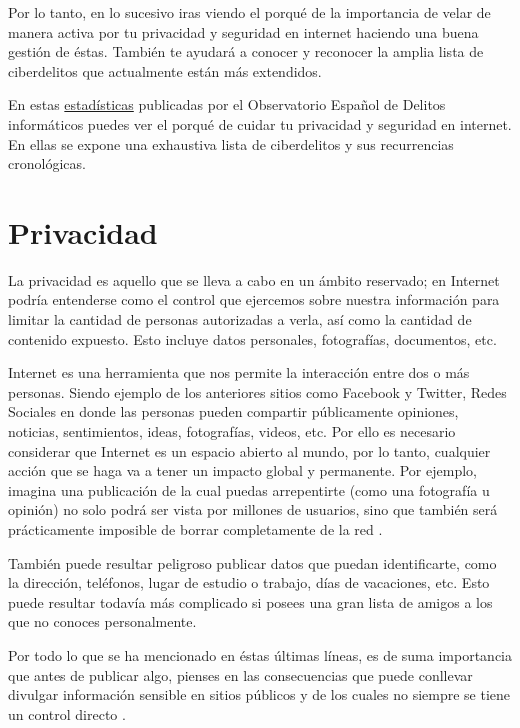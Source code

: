 \documentclass[
  spanish,
  a4paper,
  openany]{book}
\begin{document}
Por lo tanto, en lo sucesivo iras viendo el porqué de la importancia de velar de manera activa por tu privacidad y seguridad en internet haciendo una buena gestión de éstas. También te ayudará a conocer y reconocer la amplia lista de ciberdelitos que actualmente están más extendidos.

En estas \href{https://oedi.es/estadisticas/}{estadísticas} publicadas por el Observatorio Español de Delitos informáticos \citep{oedi} puedes ver el porqué de cuidar tu privacidad y seguridad en internet. En ellas se expone una exhaustiva lista de ciberdelitos y sus recurrencias cronológicas.

\hypertarget{privacidad}{%
\section{Privacidad}\label{privacidad}}

La privacidad es aquello que se lleva a cabo en un ámbito reservado; en Internet podría entenderse como el control que ejercemos sobre nuestra información para limitar la cantidad de personas autorizadas a verla, así como la cantidad de contenido expuesto. Esto incluye datos personales, fotografías, documentos, etc.

Internet es una herramienta que nos permite la interacción entre dos o más personas. Siendo ejemplo de los anteriores sitios como Facebook y Twitter, Redes Sociales en donde las personas pueden compartir públicamente opiniones, noticias, sentimientos, ideas, fotografías, videos, etc. Por ello es necesario considerar que Internet es un espacio abierto al mundo, por lo tanto, cualquier acción que se haga va a tener un impacto global y permanente. Por ejemplo, imagina una publicación de la cual puedas arrepentirte (como una fotografía u opinión) no solo podrá ser vista por millones de usuarios, sino que también será prácticamente imposible de borrar completamente de la red .

También puede resultar peligroso publicar datos que puedan identificarte, como la dirección, teléfonos, lugar de estudio o trabajo, días de vacaciones, etc. Esto puede resultar todavía más complicado si posees una gran lista de amigos a los que no conoces personalmente.

Por todo lo que se ha mencionado en éstas últimas líneas, es de suma importancia que antes de publicar algo, pienses en las consecuencias que puede conllevar divulgar información sensible en sitios públicos y de los cuales no siempre se tiene un control directo \citep{privacidad}.
\end{document}
